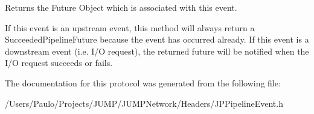 Returns the Future Object which is associated with this event. 

If this event is an upstream event, this method will always return a SucceededPipelineFuture because the event has occurred already. If this event is a downstream event (i.e. I/O request), the returned future will be notified when the I/O request succeeds or fails. 

The documentation for this protocol was generated from the following file:\begin{DoxyCompactItemize}
\item 
/Users/Paulo/Projects/JUMP/JUMPNetwork/Headers/JPPipelineEvent.h\end{DoxyCompactItemize}

